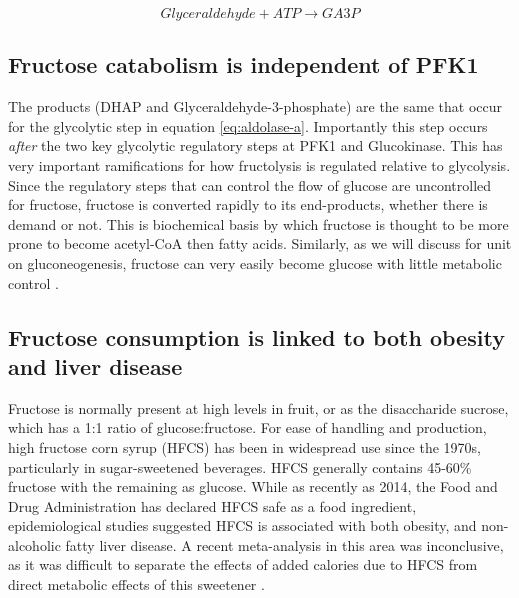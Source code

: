 \documentclass{tufte-handout}
\begin{document}
\begin{equation}
Glyceraldehyde + ATP \rightarrow GA3P
\end{equation}


\subsection{Fructose catabolism is independent of PFK1}

The products (DHAP and Glyceraldehyde-3-phosphate) are the same that occur for the glycolytic step in equation \ref{eq:aldolase-a}.  Importantly this step occurs \emph{after} the two key glycolytic regulatory steps at PFK1 and Glucokinase.  This has very important ramifications for how fructolysis is regulated  relative to glycolysis.  Since the regulatory steps that can control the flow of glucose are uncontrolled for fructose, fructose is converted rapidly to its end-products, whether there is demand or not.  This is biochemical basis by which fructose is thought to be more prone to become acetyl-CoA then fatty acids.  Similarly, as we will discuss for unit on gluconeogenesis, fructose can very easily become glucose with little metabolic control \citep{Kim2016d}.

\subsection{Fructose consumption is linked to both obesity and liver disease}

Fructose is normally present at high levels in fruit, or as the disaccharide sucrose, which has a 1:1 ratio of glucose:fructose.  For ease of handling and production, high fructose corn syrup (HFCS) has been in widespread use since the 1970s, particularly in sugar-sweetened beverages.  HFCS generally contains 45-60\% fructose with the remaining as glucose.   While as recently as 2014, the Food and Drug Administration has declared HFCS safe as a food ingredient, epidemiological studies suggested HFCS is associated with both obesity, and non-alcoholic fatty liver disease.  A recent meta-analysis in this area was inconclusive, as it was difficult to separate the effects of added calories due to HFCS from direct metabolic effects of this sweetener \citep{Chung2014}.
\end{document}
